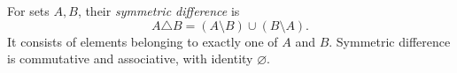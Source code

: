 
For sets $A,B$, their \emph{symmetric difference} is
\[
A\triangle B=(A\setminus B)\cup(B\setminus A).
\]
It consists of elements belonging to exactly one of $A$ and $B$. Symmetric difference is commutative and associative, with identity $\varnothing$.
